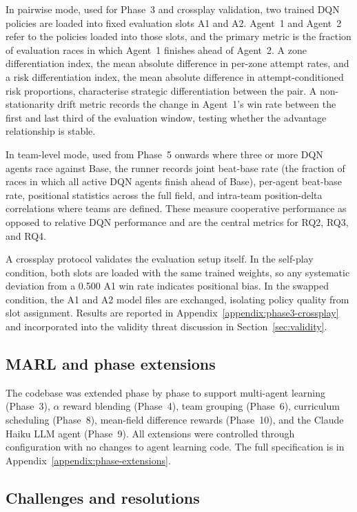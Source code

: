 In pairwise mode, used for Phase~3 and crossplay validation, two trained DQN policies are loaded into fixed evaluation slots A1 and A2. Agent~1 and Agent~2 refer to the policies loaded into those slots, and the primary metric is the fraction of evaluation races in which Agent~1 finishes ahead of Agent~2. A zone differentiation index, the mean absolute difference in per-zone attempt rates, and a risk differentiation index, the mean absolute difference in attempt-conditioned risk proportions, characterise strategic differentiation between the pair. A non-stationarity drift metric records the change in Agent~1's win rate between the first and last third of the evaluation window, testing whether the advantage relationship is stable.

In team-level mode, used from Phase~5 onwards where three or more DQN agents race against Base, the runner records joint beat-base rate (the fraction of races in which all active DQN agents finish ahead of Base), per-agent beat-base rate, positional statistics across the full field, and intra-team position-delta correlations where teams are defined. These measure cooperative performance as opposed to relative DQN performance and are the central metrics for RQ2, RQ3, and RQ4.

A crossplay protocol validates the evaluation setup itself. In the self-play condition, both slots are loaded with the same trained weights, so any systematic deviation from a 0.500 A1 win rate indicates positional bias. In the swapped condition, the A1 and A2 model files are exchanged, isolating policy quality from slot assignment. Results are reported in Appendix~\ref{appendix:phase3-crossplay} and incorporated into the validity threat discussion in Section~\ref{sec:validity}.

\subsection{MARL and phase extensions}
\label{sec:phase-extensions}

The codebase was extended phase by phase to support multi-agent learning (Phase~3), $\alpha$ reward blending (Phase~4), team grouping (Phase~6), curriculum scheduling (Phase~8), mean-field difference rewards (Phase~10), and the Claude Haiku LLM agent (Phase~9). All extensions were controlled through configuration with no changes to agent learning code. The full specification is in Appendix~\ref{appendix:phase-extensions}.

\subsection{Challenges and resolutions}

